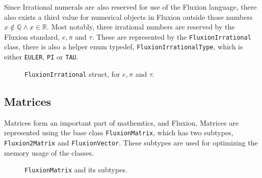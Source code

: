 \documentclass[11pt,a4paper]{article}
\newcommand{\code}[1]{\texttt{#1}}
\begin{document}
Since Irrational numerals are also reserved for use of the Fluxion language, there also exists a third value for numerical objects in Fluxion outside those numbers $x \not\in \mathbb{Q} \land x \in \mathbb{R}$. Most notably, three irrational numbers are reserved by the Fluxion standard, $e, \pi$ and $\tau$. These are represented by the \code{FluxionIrrational} class, there is also a helper enum typedef, \code{FluxionIrrationalType}, which is either \code{EULER}, \code{PI} or \code{TAU}.

\begin{figure}[httb]
\begin{center}
\end{center}
\caption{\code{FluxionIrrational} struct, for $e, \pi$ and $\tau$.}
\end{figure}

\subsection{Matrices}

Matrices form an important part of mathemtics, and Fluxion, Matrices are represented using the base class \code{FluxionMatrix}, which has two subtypes, \code{Fluxion2Matrix} and \code{FluxionVector}. These subtypes are used for optimizing the memory usage of the classes.

\begin{figure}[httb]
\begin{center}
\end{center}
\caption{\code{FluxionMatrix} and its subtypes.}
\end{figure}
\end{document}
